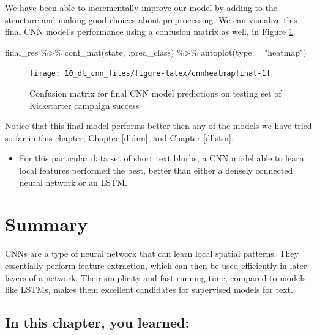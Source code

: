 \documentclass[
]{krantz}
\makeatletter
\newenvironment{Shaded}{\begin{snugshade}}{\end{snugshade}}
\newcommand{\AttributeTok}[1]{\textcolor[rgb]{0.77,0.63,0.00}{#1}}
\newcommand{\FunctionTok}[1]{\textcolor[rgb]{0.00,0.00,0.00}{#1}}
\newcommand{\NormalTok}[1]{#1}
\newcommand{\SpecialCharTok}[1]{\textcolor[rgb]{0.00,0.00,0.00}{#1}}
\newcommand{\StringTok}[1]{\textcolor[rgb]{0.31,0.60,0.02}{#1}}
\newenvironment{kframe}{%
\medskip{}
\setlength{\fboxsep}{.8em}
 \def\at@end@of@kframe{}%
 \ifinner\ifhmode%
  \def\at@end@of@kframe{\end{minipage}}%
  \begin{minipage}{\columnwidth}%
 \fi\fi%
 \def\FrameCommand##1{\hskip\@totalleftmargin \hskip-\fboxsep
 \colorbox{shadecolor}{##1}\hskip-\fboxsep
     \hskip-\linewidth \hskip-\@totalleftmargin \hskip\columnwidth}%
 \MakeFramed {\advance\hsize-\width
   \@totalleftmargin\z@ \linewidth\hsize
   \@setminipage}}%
 {\par\unskip\endMakeFramed%
 \at@end@of@kframe}
\renewenvironment{Shaded}{\begin{kframe}}{\end{kframe}}
\newenvironment{rmdblock}[1]
  {\begin{shaded*}
  \begin{itemize}[left = -1cm, labelsep = 1cm]
  \renewcommand{\labelitemi}{
    \raisebox{-.7\height}[0pt][0pt]{
      {\setkeys{Gin}{width=3em,keepaspectratio}\texttt{[image: images/\#1]}}
    }
  }
 
  \item
  }
  {
  \end{itemize}
  \end{shaded*}
  }
\newenvironment{rmdnote}
  {\begin{rmdblock}{note}}
  {\end{rmdblock}}
\makeatother
\begin{document}
We have been able to incrementally improve our model by adding to the structure and making good choices about preprocessing. We can visualize this final CNN model's performance using a confusion matrix as well, in Figure \ref{fig:cnnheatmapfinal}.

\begin{Shaded}
\begin{Highlighting}[]
\NormalTok{final\_res }\SpecialCharTok{\%\textgreater{}\%}
  \FunctionTok{conf\_mat}\NormalTok{(state, .pred\_class) }\SpecialCharTok{\%\textgreater{}\%}
  \FunctionTok{autoplot}\NormalTok{(}\AttributeTok{type =} \StringTok{"heatmap"}\NormalTok{)}
\end{Highlighting}
\end{Shaded}

\begin{figure}

{\centering \texttt{[image: 10\_dl\_cnn\_files/figure-latex/cnnheatmapfinal-1]} 

}

\caption{Confusion matrix for final CNN model predictions on testing set of Kickstarter campaign success}\label{fig:cnnheatmapfinal}
\end{figure}

Notice that this final model performs better then any of the models we have tried so far in this chapter, Chapter \ref{dldnn}, and Chapter \ref{dllstm}.

\begin{rmdnote}
For this particular data set of short text blurbs, a CNN model able to
learn local features performed the best, better than either a densely
connected neural network or an LSTM.
\end{rmdnote}

\hypertarget{dlcnnsummary}{%
\section{Summary}\label{dlcnnsummary}}

CNNs are a type of neural network that can learn local spatial patterns. They essentially perform feature extraction, which can then be used efficiently in later layers of a network. Their simplicity and fast running time, compared to models like LSTMs, makes them excellent candidates for supervised models for text.

\hypertarget{in-this-chapter-you-learned-9}{%
\subsection{In this chapter, you learned:}\label{in-this-chapter-you-learned-9}}
\end{document}
